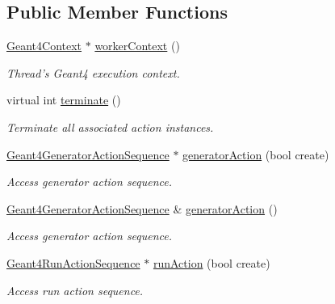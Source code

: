 \subsection*{Public Member Functions}
\begin{DoxyCompactItemize}
\item 
\hyperlink{class_d_d4hep_1_1_simulation_1_1_geant4_context}{Geant4Context} $\ast$ \hyperlink{class_d_d4hep_1_1_simulation_1_1_geant4_action_container_a6fe45521592147fe47d7cc545add8ca0}{workerContext} ()
\begin{DoxyCompactList}\small\item\em Thread's Geant4 execution context. \item\end{DoxyCompactList}\item 
virtual int \hyperlink{class_d_d4hep_1_1_simulation_1_1_geant4_action_container_ad9cfc3e1bc35d384f5dbd4e8747ddf69}{terminate} ()
\begin{DoxyCompactList}\small\item\em Terminate all associated action instances. \item\end{DoxyCompactList}\item 
\hyperlink{class_d_d4hep_1_1_simulation_1_1_geant4_generator_action_sequence}{Geant4GeneratorActionSequence} $\ast$ \hyperlink{class_d_d4hep_1_1_simulation_1_1_geant4_action_container_aac0430d56fb1bc7db0b71720c49033a4}{generatorAction} (bool create)
\begin{DoxyCompactList}\small\item\em Access generator action sequence. \item\end{DoxyCompactList}\item 
\hyperlink{class_d_d4hep_1_1_simulation_1_1_geant4_generator_action_sequence}{Geant4GeneratorActionSequence} \& \hyperlink{class_d_d4hep_1_1_simulation_1_1_geant4_action_container_a1c16fc087f37dc5350691bcc89a7a40e}{generatorAction} ()
\begin{DoxyCompactList}\small\item\em Access generator action sequence. \item\end{DoxyCompactList}\item 
\hyperlink{class_d_d4hep_1_1_simulation_1_1_geant4_run_action_sequence}{Geant4RunActionSequence} $\ast$ \hyperlink{class_d_d4hep_1_1_simulation_1_1_geant4_action_container_a5ce39c42386a93c9e446d8651495c11e}{runAction} (bool create)
\begin{DoxyCompactList}\small\item\em Access run action sequence. \item\end{DoxyCompactList}\item 

\end{DoxyCompactItemize}
